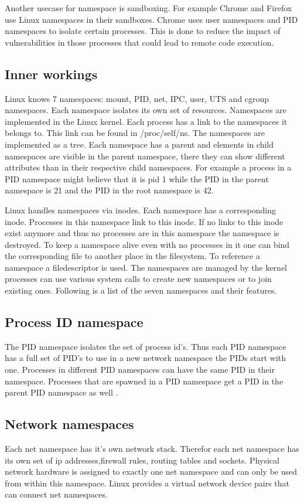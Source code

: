 \documentclass[10pt,twocolumn,a4paper]{article}
\begin{document}
Another usecase for namespace is sandboxing. For example Chrome and Firefox use Linux namespaces in their sandboxes. 
Chrome uses user namespaces and PID namespaces to isolate certain processes.
This is done to reduce the impact of vulnerabilities in those processes that could lead to remote code execution.


\subsection{Inner workings}
Linux knows 7 namespaces: mount, PID, net, IPC, user, UTS and cgroup namespaces. Each namespace
isolates its own set of resources. Namespaces are implemented in the Linux kernel.
Each process has a link to the namespaces it belongs to. This link can be found in
/proc/self/ns\cite{8}. The namespaces are implemented as a tree. Each namespace has a parent and 
elements in child namespaces are visible in the parent namespace, there they can show different
attributes than in their respective child namespaces. For example a process in a PID namespace might 
believe that it is pid 1 while the PID in the parent namespace is 21 and the PID in the root namespace is 42.

Linux handles namespaces via inodes. Each namespace has a corresponding inode. Processes in this
namespace link to this inode. If no links to this inode exist anymore and thus no processes are in
this namespace the namespace is destroyed. To keep a namespace alive even with no processes in it
one can bind the corresponding file to another place in the filesystem. To reference a namespace a
filedescriptor is used. The namespaces are managed by the kernel processes can use various system
calls to create new namespaces or to join existing ones.\cite{8} Following is a list of the seven
namespaces and their features.


\subsection{Process ID namespace}
The PID namespace isolates the set of process id's. 
Thus each PID namespace has a full set of PID's to use in a new network namespace the PIDs start
with one.
Processes in different PID namespaces can have the same PID in their namespace. 
Processes that are spawned in a PID namespace get a PID in the parent PID namespace as well 
\cite{11}.

\subsection{Network namespaces}
Each net namespace has it's own network stack. Therefor each net namespace has its own set of ip
addresses,firewall rules, routing tables and sockets. Physical network hardware is assigned to exactly one
net namespace and can only be used from within this namespace. Linux provides a virtual network device
pairs that can connect net namespaces.\cite{10}
\end{document}
